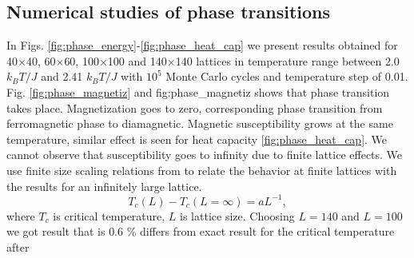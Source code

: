\documentclass[10pt]{article}
\begin{document}
\newpage

\subsection{Numerical studies of phase transitions}
In Figs. \ref{fig:phase_energy}-\ref{fig:phase_heat_cap} we present results obtained for 40$\times$40, 60$\times$60, 100$\times$100 and 140$\times$140 lattices in temperature range between 2.0 $k_BT/J$ and 2.41 $k_BT/J$ with $10^5$ Monte Carlo cycles and temperature step of 0.01. Fig. \ref{fig:phase_magnetiz} and fig:phase_magnetiz shows that phase transition takes place. Magnetization goes to zero, corresponding phase transition from ferromagnetic phase to diamagnetic. Magnetic susceptibility grows at the same temperature, similar effect is seen for heat capacity \ref{fig:phase_heat_cap}. We cannot observe that susceptibility goes to infinity due to finite lattice effects.
We use finite size scaling relations from \cite{one} to relate the behavior at finite lattices with the results for
an infinitely large lattice.
\[
T_c(L) - T_c(L = \infty ) = a L^{-1},
\]
where $T_c$ is critical temperature, $L$ is lattice size. Choosing $L=140$ and $L=100$ we got result that is $0.6$ \% differs from exact result for the critical temperature after \cite{Onsager}
\end{document}
